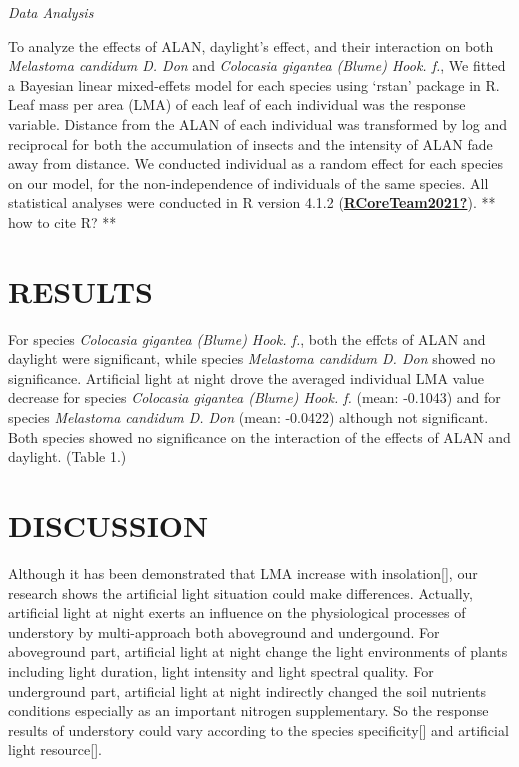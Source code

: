 \documentclass[
]{article}
\begin{document}
\emph{Data Analysis}

To analyze the effects of ALAN, daylight's effect, and their interaction
on both \emph{Melastoma candidum D. Don} and \emph{Colocasia gigantea
(Blume) Hook. f.}, We fitted a Bayesian linear mixed-effets model for
each species using `rstan' package in R. Leaf mass per area (LMA) of
each leaf of each individual was the response variable. Distance from
the ALAN of each individual was transformed by log and reciprocal for
both the accumulation of insects and the intensity of ALAN fade away
from distance. We conducted individual as a random effect for each
species on our model, for the non-independence of individuals of the
same species. All statistical analyses were conducted in R version 4.1.2
(\protect\hyperlink{ref-RCoreTeam2021}{\textbf{RCoreTeam2021?}}). ** how
to cite R? **

\hypertarget{results}{%
\section{RESULTS}\label{results}}

For species \emph{Colocasia gigantea (Blume) Hook. f.}, both the effcts
of ALAN and daylight were significant, while species \emph{Melastoma
candidum D. Don} showed no significance. Artificial light at night drove
the averaged individual LMA value decrease for species \emph{Colocasia
gigantea (Blume) Hook. f.} (mean: -0.1043) and for species
\emph{Melastoma candidum D. Don} (mean: -0.0422) although not
significant. Both species showed no significance on the interaction of
the effects of ALAN and daylight. (Table 1.)

\hypertarget{discussion}{%
\section{DISCUSSION}\label{discussion}}

Although it has been demonstrated that LMA increase with
insolation{[}{]}, our research shows the artificial light situation
could make differences. Actually, artificial light at night exerts an
influence on the physiological processes of understory by multi-approach
both aboveground and undergound. For aboveground part, artificial light
at night change the light environments of plants including light
duration, light intensity and light spectral quality. For underground
part, artificial light at night indirectly changed the soil nutrients
conditions especially as an important nitrogen supplementary. So the
response results of understory could vary according to the species
specificity{[}{]} and artificial light resource{[}{]}.
\end{document}
